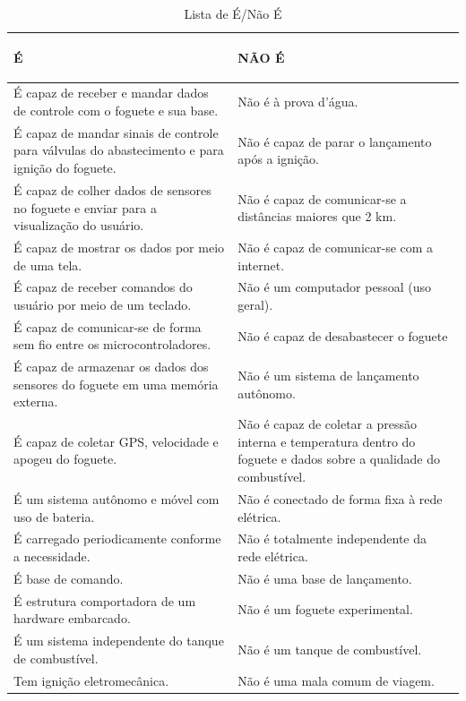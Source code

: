 \begin{center}
\begin{table}[H]
\begin{tabular}{ | m{7cm} | m{7cm}| } 
 \hline
\begin{center}\textbf{É }\end{center} & \begin{center} \textbf{NÃO É}\end{center}   \\ 
 \hline
É capaz de receber e mandar dados de controle com o foguete e sua base. & Não é à prova d’água. \\ 
 \hline
 É capaz de mandar sinais de controle para válvulas do abastecimento e para ignição do foguete. & Não é capaz de parar o lançamento após a ignição. \\ 
 \hline
É capaz de colher dados de sensores no foguete e enviar para a visualização do usuário. & Não é capaz de comunicar-se a distâncias maiores que 2 km. \\ 
 \hline
É capaz de mostrar os dados por meio de uma tela. & Não é capaz de comunicar-se com a internet.\\ 
 \hline
 É capaz de receber comandos do usuário por meio de um teclado. & Não é um computador pessoal (uso geral). \\
 \hline
 É capaz de comunicar-se de forma sem fio entre os microcontroladores. & Não é capaz de desabastecer o foguete \\
 \hline
 É capaz de armazenar os dados dos sensores do foguete em uma memória externa. & Não é um sistema de lançamento autônomo. \\
 \hline
 É capaz de coletar GPS, velocidade e apogeu do foguete. & Não é capaz de coletar a pressão interna e temperatura dentro do foguete e dados sobre a qualidade do combustível. \\
 \hline
 É um sistema autônomo e móvel com uso de bateria. & Não é conectado de forma fixa à rede elétrica. \\
 \hline
 É carregado periodicamente conforme a necessidade. & Não é totalmente independente da rede elétrica. \\
 \hline
É base de comando. & Não é uma base de lançamento. \\
\hline
É estrutura comportadora de um hardware embarcado. & Não é um foguete experimental. \\
\hline
É um sistema independente do tanque de combustível. & Não é um tanque de combustível. \\
\hline
Tem ignição eletromecânica. & Não é uma mala comum de viagem. \\
\hline
\end{tabular}
\label{Lista de É/Não É}
\caption{Lista de É/Não É}
\end{table}
\end{center}

